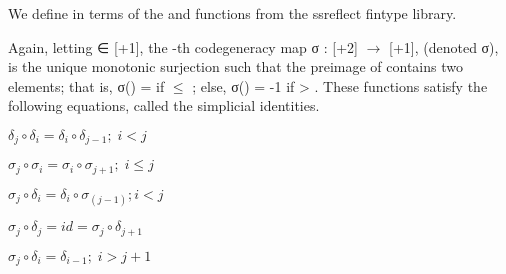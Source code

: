 \documentclass[12pt]{report}
\begin{document}
 We define  in terms of the  and  functions from the ssreflect fintype library. 

 Again, letting  ∈ [+1], the -th codegeneracy map σ : [+2] \ensuremath{\rightarrow} [+1], (denoted σ), is the unique monotonic surjection such that the preimage of  contains two elements; that is, σ() =  if  \ensuremath{\le} ; else, σ() = -1 if  > . These functions satisfy the following equations, called the simplicial identities. 

  $\delta_j \circ \delta_i = \delta_i \circ \delta_{j-1} ;\;  i < j $ 

   $\sigma_j \circ \sigma_i = \sigma_i \circ \sigma_{j+1}  ;\;  i \leq j$ 

   $\sigma_j \circ \delta_i = \delta_i \circ \sigma_(j-1)   ;  i < j $ 

   $\sigma_j \circ \delta_j = id = \sigma_j \circ \delta_{j+1}$ 

   $\sigma_j \circ \delta_i = \delta_{i-1} ;\; i > j+1$  
\end{document}
